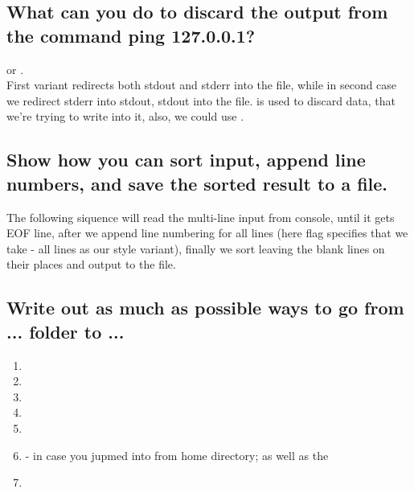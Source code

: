 \documentclass{article}
\begin{document}
\subsection{What can you do to discard the output from the command ping 127.0.0.1?}
\noindent

 or .\\

First variant redirects both stdout and stderr into the file, while in second case we redirect stderr into stdout, stdout into the file.
 is used to discard data, that we're trying to write into it, also, we could use .

\subsection{Show how you can sort input, append line numbers, and save the sorted result to a file.}
\noindent

The following siquence will read the multi-line input from console, until it gets EOF line, after we append line numbering for all lines
(here flag  specifies that we take  - all lines as our style variant),
finally we sort leaving the blank lines on their places and output to the file. \\


\subsection{Write out as much as possible ways to go from ... folder to ...}
\noindent

\begin{enumerate}
	\item {}
	\item {}
	\item {}
	\item {}
	\item {}
	\item {} - in case you jupmed into  from home directory; as well as the 
	\item {}
\end{enumerate}
\end{document}
